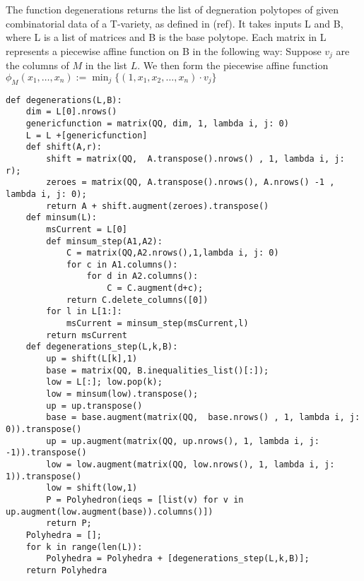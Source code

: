 The function degenerations returns the list of degneration polytopes of given combinatorial data of a T-variety, as defined in (ref). It takes inputs L and B, where L is a list of matrices and B is the base polytope. Each matrix in L represents a piecewise affine function on B in the following way: Suppose \(v_j\) are the columns of \(M\) in the list \(L\). We then form the piecewise affine function \(\phi_M(x_1,\dots,x_n) := \min_j \{ (1,x_1,x_2,\dots,x_n) \cdot v_j \} \)

\begin{lstlisting}
def degenerations(L,B):
    dim = L[0].nrows()
    genericfunction = matrix(QQ, dim, 1, lambda i, j: 0)
    L = L +[genericfunction]
    def shift(A,r):
        shift = matrix(QQ,  A.transpose().nrows() , 1, lambda i, j: r);
        zeroes = matrix(QQ, A.transpose().nrows(), A.nrows() -1 , lambda i, j: 0);
        return A + shift.augment(zeroes).transpose()
    def minsum(L):
        msCurrent = L[0]
        def minsum_step(A1,A2):
            C = matrix(QQ,A2.nrows(),1,lambda i, j: 0)
            for c in A1.columns():
                for d in A2.columns():
                    C = C.augment(d+c);
            return C.delete_columns([0])
        for l in L[1:]:
            msCurrent = minsum_step(msCurrent,l)
        return msCurrent
    def degenerations_step(L,k,B):
        up = shift(L[k],1)
        base = matrix(QQ, B.inequalities_list()[:]);
        low = L[:]; low.pop(k);
        low = minsum(low).transpose();
        up = up.transpose()
        base = base.augment(matrix(QQ,  base.nrows() , 1, lambda i, j: 0)).transpose()
        up = up.augment(matrix(QQ, up.nrows(), 1, lambda i, j: -1)).transpose()
        low = low.augment(matrix(QQ, low.nrows(), 1, lambda i, j: 1)).transpose()
        low = shift(low,1)
        P = Polyhedron(ieqs = [list(v) for v in up.augment(low.augment(base)).columns()])
        return P;
    Polyhedra = [];
    for k in range(len(L)):
        Polyhedra = Polyhedra + [degenerations_step(L,k,B)];
    return Polyhedra
\end{lstlisting}

